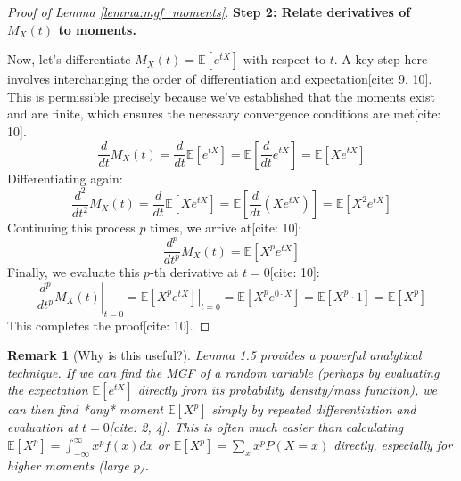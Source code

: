 \documentclass[12pt]{article}
\newtheorem{remark}[theorem]{Remark}
\begin{document}
\begin{proof}[Proof of Lemma \ref{lemma:mgf_moments}]
\textbf{Step 2: Relate derivatives of $M_X(t)$ to moments.}

Now, let's differentiate $M_X(t) = \mathbb{E}[e^{tX}]$ with respect to $t$. A key step here involves interchanging the order of differentiation and expectation[cite: 9, 10]. This is permissible precisely because we've established that the moments exist and are finite, which ensures the necessary convergence conditions are met[cite: 10].
\[
\frac{d}{dt} M_X(t) = \frac{d}{dt} \mathbb{E}[e^{tX}] = \mathbb{E}\left[ \frac{d}{dt} e^{tX} \right] = \mathbb{E}[X e^{tX}]
\]
Differentiating again:
\[
\frac{d^2}{dt^2} M_X(t) = \frac{d}{dt} \mathbb{E}[X e^{tX}] = \mathbb{E}\left[ \frac{d}{dt} (X e^{tX}) \right] = \mathbb{E}[X^2 e^{tX}]
\]
Continuing this process $p$ times, we arrive at[cite: 10]:
\[
\frac{d^p}{dt^p} M_X(t) = \mathbb{E}[X^p e^{tX}]
\]
Finally, we evaluate this $p$-th derivative at $t=0$[cite: 10]:
\[
\left. \frac{d^p}{dt^p} M_X(t) \right|_{t=0} = \left. \mathbb{E}[X^p e^{tX}] \right|_{t=0} = \mathbb{E}[X^p e^{0 \cdot X}] = \mathbb{E}[X^p \cdot 1] = \mathbb{E}[X^p]
\]
This completes the proof[cite: 10].
\end{proof}

\begin{remark}[Why is this useful?]
Lemma 1.5 provides a powerful analytical technique. If we can find the MGF of a random variable (perhaps by evaluating the expectation $\mathbb{E}[e^{tX}]$ directly from its probability density/mass function), we can then find *any* moment $\mathbb{E}[X^p]$ simply by repeated differentiation and evaluation at $t=0$[cite: 2, 4]. This is often much easier than calculating $\mathbb{E}[X^p] = \int_{-\infty}^{\infty} x^p f(x) dx$ or $\mathbb{E}[X^p] = \sum_x x^p P(X=x)$ directly, especially for higher moments (large $p$).
\end{remark}
\end{document}
